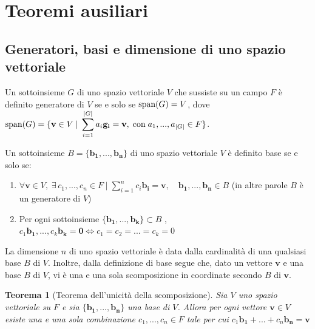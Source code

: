 \documentclass{article}
\newtheorem{theorem}{Teorema}
\begin{document}
\setlength{\parindent}{0pt}

\section{Teoremi ausiliari}
    \subsection{Generatori, basi e dimensione di uno spazio vettoriale}
    Un sottoinsieme $G$ di uno spazio vettoriale $V$ che sussiste su un campo $F$ è definito generatore di $V$ se e solo se $\textnormal{span}(G) = V$, dove $\textnormal{span}(G) = \{\mathbf{v} \in V \; | \; \displaystyle\sum_{i = 1}^{|G|} a_i \mathbf{g_i} = \mathbf{v}, \; \textnormal{con} \; a_1, ..., a_{|G|} \in F\}$.

    \vspace{10pt}
    Un sottoinsieme $B = \{\mathbf{b_1},...,\mathbf{b_n}\}$ di uno spazio vettoriale $V$ è definito base se e solo se:
    \begin{enumerate}[label=(\arabic*)]
        \item $ \forall \mathbf{v} \in V, \; \exists \, c_1, ..., c_n \in F \; | \; \displaystyle\sum_{i = 1}^{n} c_i \mathbf{b_i} = \mathbf{v}, \quad \mathbf{b_1}, ..., \mathbf{b_n} \in B$ (in altre parole $B$ è un generatore di $V$) 
        \item Per ogni sottoinsieme $\{\mathbf{b_1}, ..., \mathbf{b_k}\} \subset B$ , $c_1 \mathbf{b_1}, ..., c_k \mathbf{b_k} = \mathbf{0} \iff c_1 = c_2 = ... = c_k = 0 $  
    \end{enumerate}

    \vspace{5pt}
    La dimensione $n$ di uno spazio vettoriale è data dalla cardinalità di una qualsiasi base $B$ di $V$.
    Inoltre, dalla definizione di base segue che, dato un vettore $\mathbf{v}$ e una base $B$ di $V$, vi è una e una sola scomposizione in coordinate secondo $B$ di $\mathbf{v}$.

    \vspace{10pt}
    \begin{theorem}[Teorema dell'unicità della scomposizione]
        Sia $V$ uno spazio vettoriale su $F$ e sia $\{\mathbf{b_1},...,\mathbf{b_n}\}$ una base di $V$. Allora per ogni vettore $\mathbf{v} \in V$ esiste una e una sola combinazione
        $c_1,...,c_n \in F$ tale per cui $c_1\mathbf{b_1} + ... + c_n\mathbf{b_n} = \mathbf{v}$
    \end{theorem}
\end{document}
